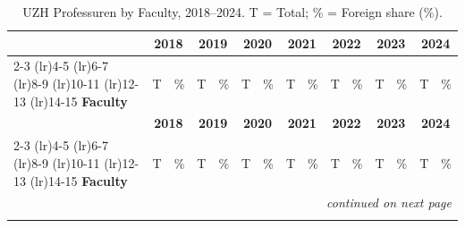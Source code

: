 \documentclass{article}
\begin{document}
\vspace{1.5em}
\begin{longtable}{@{}l rr rr rr rr rr rr rr@{}}
  \caption{UZH Professuren by Faculty, 2018--2024. T = Total; \% = Foreign share (\%).}
  \label{tab:uzh_professors_part2} \\
  \toprule
   & \multicolumn{2}{c}{\textbf{2018}} & \multicolumn{2}{c}{\textbf{2019}} & \multicolumn{2}{c}{\textbf{2020}} & \multicolumn{2}{c}{\textbf{2021}} & \multicolumn{2}{c}{\textbf{2022}} & \multicolumn{2}{c}{\textbf{2023}} & \multicolumn{2}{c}{\textbf{2024}} \\
  \cmidrule(lr){2-3} \cmidrule(lr){4-5} \cmidrule(lr){6-7} \cmidrule(lr){8-9} \cmidrule(lr){10-11} \cmidrule(lr){12-13} \cmidrule(lr){14-15}
  \textbf{Faculty}  & T & \% & T & \% & T & \% & T & \% & T & \% & T & \% & T & \% \\
  \midrule
  \endfirsthead

  \toprule
   & \multicolumn{2}{c}{\textbf{2018}} & \multicolumn{2}{c}{\textbf{2019}} & \multicolumn{2}{c}{\textbf{2020}} & \multicolumn{2}{c}{\textbf{2021}} & \multicolumn{2}{c}{\textbf{2022}} & \multicolumn{2}{c}{\textbf{2023}} & \multicolumn{2}{c}{\textbf{2024}} \\
  \cmidrule(lr){2-3} \cmidrule(lr){4-5} \cmidrule(lr){6-7} \cmidrule(lr){8-9} \cmidrule(lr){10-11} \cmidrule(lr){12-13} \cmidrule(lr){14-15}
  \textbf{Faculty}  & T & \% & T & \% & T & \% & T & \% & T & \% & T & \% & T & \% \\
  \midrule
  \endhead

  \midrule
  \multicolumn{15}{r}{\textit{continued on next page}} \\
  \endfoot

  \bottomrule
  \endlastfoot


\end{longtable}
\end{document}
